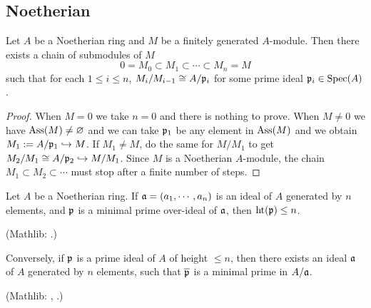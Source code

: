 \subsection{Noetherian}

\begin{prop}
\label{noeth-ring-filtration}
\leanok
Let $A$ be a Noetherian ring and $M$ be a finitely generated $A$-module.
Then there exists a chain of submodules of $M$
\[0 = M_0 \subset M_1 \subset \cdots \subset M_n = M\]
such that for each $1\leq i\leq n$, $M_i/M_{i-1} \cong A/{\mathfrak{p}}_i$ for some prime ideal ${\mathfrak{p}}_i\in{\mathrm{Spec}}(A)$.
\end{prop}

\begin{proof}
\leanok
When $M=0$ we take $n=0$ and there is nothing to prove.
When $M\neq 0$ we have $\operatorname{Ass}(M)\neq\varnothing$
and we can take ${\mathfrak{p}}_1$ be any element in $\operatorname{Ass}(M)$
and we obtain $M_1:=A/{\mathfrak{p}}_1\hookrightarrow M$.
If $M_1\neq M$, do the same for $M/M_1$ to get $M_2/M_1\cong A/{\mathfrak{p}}_2\hookrightarrow M/M_1$.
Since $M$ is a Noetherian $A$-module,
the chain $M_1\subset M_2\subset\cdots$ must stop after a finite number of steps.
\end{proof}

\begin{thm}
\leanok
\label{krull-principal-ideal-thm}
Let $A$ be a Noetherian ring.
If ${\mathfrak{a}}=(a_1,\cdots,a_n)$ is an ideal of $A$ generated by $n$ elements,
and ${\mathfrak{p}}$ is a minimal prime over-ideal of ${\mathfrak{a}}$, then ${\mathrm{ht}}({\mathfrak{p}})\leq n$.

(Mathlib: .)

Conversely, if ${\mathfrak{p}}$ is a prime ideal of $A$ of height $\leq n$,
then there exists an ideal ${\mathfrak{a}}$ of $A$ generated by $n$ elements, such that
$\overline{{\mathfrak{p}}}$ is a minimal prime in $A/{\mathfrak{a}}$.

(Mathlib: ,
.)
\end{thm}

